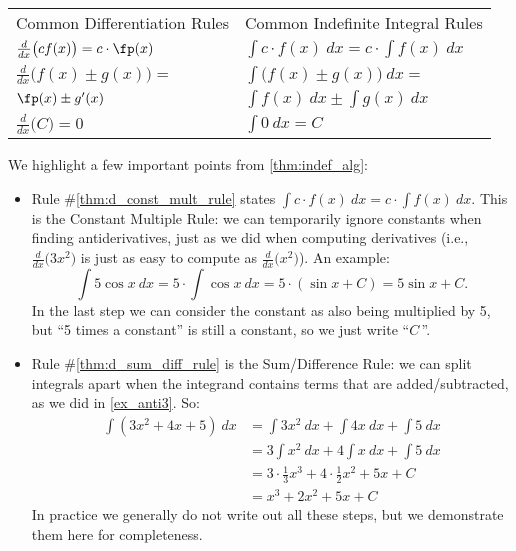 \begin{theorem}\label{thm:indef_alg}
\begin{anywhereenum}\renewcommand{\arraystretch}{1.7}
\begin{tabular}{ll}
Common Differentiation Rules & Common Indefinite Integral Rules\\
\item\label{thm:d_const_mult_rule} $\frac{d}{dx}\big(cf(x) \big) = c\cdot \fp(x)$ &
\item[\theanywhereenumi] $\int c\cdot f(x)\ dx = c\cdot \int f(x)\ dx$ \\
\item\label{thm:d_sum_diff_rule} $\frac{d}{dx}\big(f(x)\pm g(x) \big) =$ &
\item[\theanywhereenumi] $\int \big(f(x)\pm g(x)\big)\ dx =$ \\[-1ex]
\qquad$\fp(x)\pm g'(x)$ & 
\qquad$\int f(x)\ dx\pm \int g(x)\ dx$ \\
\item $\frac{d}{dx}\big(C \big) = 0$ &
\item[\theanywhereenumi] $\int 0\ dx = C$
\end{tabular}
\end{anywhereenum}
\end{theorem}

We highlight a few important points from \autoref{thm:indef_alg}:
\begin{itemize}
	\item	Rule \#\ref{thm:d_const_mult_rule} states $\int c\cdot f(x)\ dx = c\cdot \int f(x)\ dx$. This is the Constant Multiple Rule: we can temporarily ignore constants when finding antiderivatives, just as we did when computing derivatives (i.e., $\frac{d}{dx}\big(3x^2\big)$ is just as easy to compute as $\frac{d}{dx}\big(x^2\big)$). An example:
	\[\int 5\cos x\ dx = 5\cdot\int \cos x\ dx = 5\cdot (\sin x+C) = 5\sin x + C.\]
	In the last step we can consider the constant as also being multiplied by 5, but ``5 times a constant'' is still a constant, so we just write ``$C$\,''.
	\item	Rule \#\ref{thm:d_sum_diff_rule} is the Sum/Difference Rule: we can split integrals apart when the integrand contains terms that are added/subtracted, as we did in \autoref{ex_anti3}. So:
	\begin{align*}
		\int(3x^2+4x+5)\ dx
		&= \int 3x^2\ dx + \int 4x\ dx + \int 5\ dx \\
		&= 3\int x^2\ dx + 4\int x\ dx + \int 5 \ dx\\
		&= 3\cdot \frac13x^3 + 4\cdot \frac12x^2+5x+C\\
		&= x^3+2x^2+5x+C
	\end{align*}
	In practice we generally do not write out all these steps, but we demonstrate them here for completeness.
\end{itemize}


